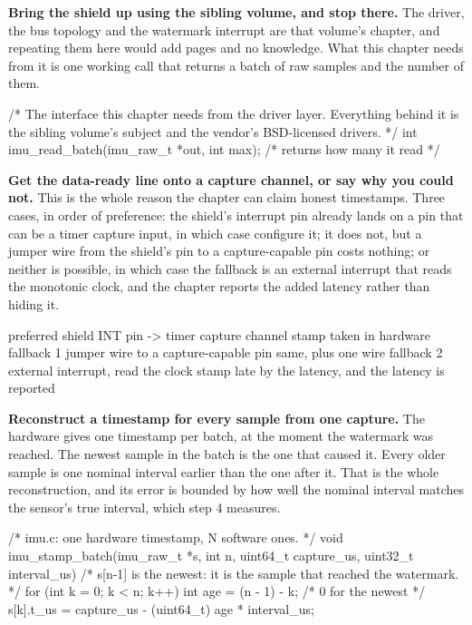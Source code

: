 \begin{steps}
\item \textbf{Bring the shield up using the sibling volume, and stop there.} The
driver, the bus topology and the watermark interrupt are that volume's chapter,
and repeating them here would add pages and no knowledge. What this chapter
needs from it is one working call that returns a batch of raw samples and the
number of them.
\begin{ccode}
/* The interface this chapter needs from the driver layer. Everything behind it
   is the sibling volume's subject and the vendor's BSD-licensed drivers. */
int imu_read_batch(imu_raw_t *out, int max);   /* returns how many it read */
\end{ccode}

\item \textbf{Get the data-ready line onto a capture channel, or say why you
could not.} This is the whole reason the chapter can claim honest timestamps.
Three cases, in order of preference: the shield's interrupt pin already lands on
a pin that can be a timer capture input, in which case configure it; it does
not, but a jumper wire from the shield's pin to a capture-capable pin costs
nothing; or neither is possible, in which case the fallback is an external
interrupt that reads the monotonic clock, and the chapter reports the added
latency rather than hiding it.
\begin{plaincode}
preferred   shield INT pin -> timer capture channel   stamp taken in hardware
fallback 1  jumper wire to a capture-capable pin      same, plus one wire
fallback 2  external interrupt, read the clock        stamp late by the latency,
                                                      and the latency is reported
\end{plaincode}

\item \textbf{Reconstruct a timestamp for every sample from one capture.} The
hardware gives one timestamp per batch, at the moment the watermark was reached.
The newest sample in the batch is the one that caused it. Every older sample is
one nominal interval earlier than the one after it. That is the whole
reconstruction, and its error is bounded by how well the nominal interval
matches the sensor's true interval, which step 4 measures.
\begin{ccode}
/* imu.c: one hardware timestamp, N software ones. */
void imu_stamp_batch(imu_raw_t *s, int n, uint64_t capture_us, uint32_t interval_us)
{
    /* s[n-1] is the newest: it is the sample that reached the watermark. */
    for (int k = 0; k < n; k++) {
        int age = (n - 1) - k;                       /* 0 for the newest */
        s[k].t_us = capture_us - (uint64_t) age * interval_us;
    }
}
\end{ccode}


\end{steps}
